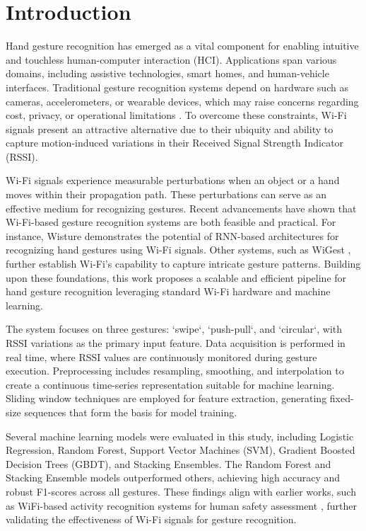 \documentclass[10pt,twocolumn,letterpaper]{article}
\begin{document}

\section{Introduction}

Hand gesture recognition has emerged as a vital component for enabling intuitive and touchless human-computer interaction (HCI). Applications span various domains, including assistive technologies, smart homes, and human-vehicle interfaces. Traditional gesture recognition systems depend on hardware such as cameras, accelerometers, or wearable devices, which may raise concerns regarding cost, privacy, or operational limitations \cite{camera_based, sensor_based}. To overcome these constraints, Wi-Fi signals present an attractive alternative due to their ubiquity and ability to capture motion-induced variations in their Received Signal Strength Indicator (RSSI).

Wi-Fi signals experience measurable perturbations when an object or a hand moves within their propagation path. These perturbations can serve as an effective medium for recognizing gestures. Recent advancements have shown that Wi-Fi-based gesture recognition systems are both feasible and practical. For instance, Wisture \cite{haseeb2020wisture} demonstrates the potential of RNN-based architectures for recognizing hand gestures using Wi-Fi signals. Other systems, such as WiGest \cite{abdelnasser2015wifi}, further establish Wi-Fi's capability to capture intricate gesture patterns. Building upon these foundations, this work proposes a scalable and efficient pipeline for hand gesture recognition leveraging standard Wi-Fi hardware and machine learning.

The system focuses on three gestures: `swipe`, `push-pull`, and `circular`, with RSSI variations as the primary input feature. Data acquisition is performed in real time, where RSSI values are continuously monitored during gesture execution. Preprocessing includes resampling, smoothing, and interpolation to create a continuous time-series representation suitable for machine learning. Sliding window techniques are employed for feature extraction, generating fixed-size sequences that form the basis for model training.

Several machine learning models were evaluated in this study, including Logistic Regression, Random Forest, Support Vector Machines (SVM), Gradient Boosted Decision Trees (GBDT), and Stacking Ensembles. The Random Forest and Stacking Ensemble models outperformed others, achieving high accuracy and robust F1-scores across all gestures. These findings align with earlier works, such as WiFi-based activity recognition systems for human safety assessment \cite{wang2017wifi}, further validating the effectiveness of Wi-Fi signals for gesture recognition.
\end{document}
